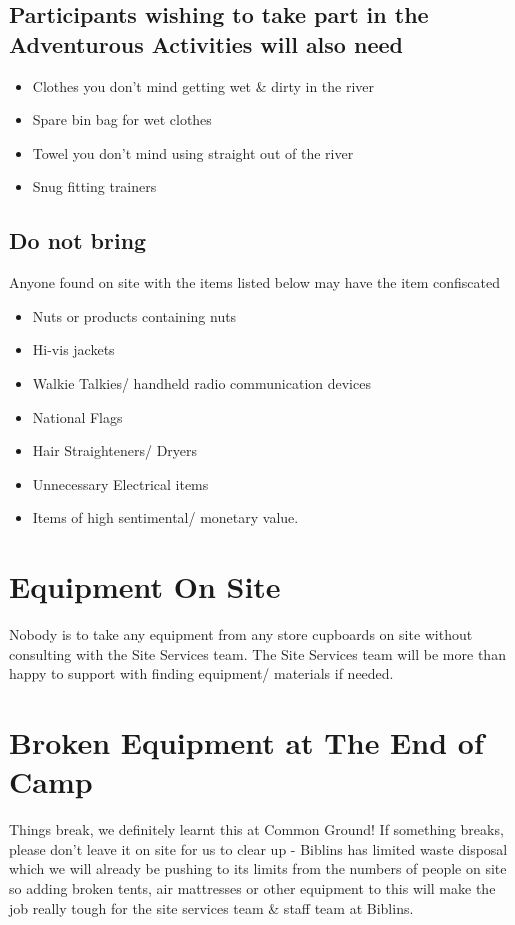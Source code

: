 \documentclass[a4paper, 11pt]{report}
\newcommand{\nl}{\newline}
\begin{document}
\subsection{Participants wishing to take part in the Adventurous Activities will also need}
\begin{itemize}
    \item Clothes you don't mind getting wet \& dirty in the river
    \item Spare bin bag for wet clothes
    \item Towel you don't mind using straight out of the river
    \item Snug fitting trainers
\end{itemize}
\subsection{Do not bring}
Anyone found on site with the items listed below may have the item confiscated
\begin{itemize}
    \item Nuts or products containing nuts
    \item Hi-vis jackets
    \item Walkie Talkies/ handheld radio communication devices
    \item National Flags
    \item Hair Straighteners/ Dryers
    \item Unnecessary Electrical items
    \item Items of high sentimental/ monetary value.
\end{itemize}

\section{Equipment On Site}
Nobody is to take any equipment from any store cupboards on site without consulting with the Site Services team. The Site Services team will be more than happy to support with finding equipment/ materials if needed.

\section{Broken Equipment at The End of Camp}
Things break, we definitely learnt this at Common Ground! If something breaks, please don't leave it on site for us to clear up - Biblins has limited waste disposal which we will already be pushing to its limits from the numbers of people on site so adding broken tents, air mattresses or other equipment to this will make the job really tough for the site services team \& staff team at Biblins.\nl
\end{document}
